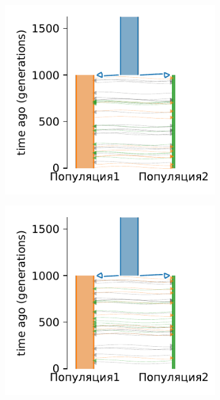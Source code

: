 \begin{figure}[ht]
    \centering
    \begin{subfigure}[b]{.33\textwidth}
    \includegraphics[width=\textwidth]{images_experiments/simulation_1/2pop/picture_1pop_model_1_powell_over.pdf}
    \caption{}
    \label{fig:part2:experiments:simulated_2:results_model_1_1}
    \end{subfigure}%
    \begin{subfigure}[b]{.33\textwidth}
    \includegraphics[width=\textwidth]{images_experiments/simulation_1/2pop/picture_1pop_model_1_dadi_pipeline_over.pdf}

\end{subfigure}
\end{figure}
